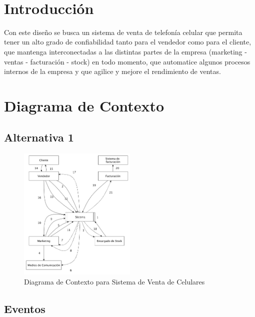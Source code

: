 ‌\section{Introducción}
Con este diseño se busca un sistema de venta de telefonía celular que permita tener un alto grado de confiabilidad tanto para el vendedor como para el cliente, que mantenga interconectadas a las distintas partes de la empresa (marketing - ventas - facturación - stock) en todo momento, que automatice algunos procesos internos de la empresa y que agilice y mejore el rendimiento de ventas.\\

\section{Diagrama de Contexto}

\subsection{Alternativa 1}

\begin{figure}[h!]
  \centering
  \includegraphics[width=0.5\textwidth]{./imagenes/contexto_1.pdf}
  \caption{Diagrama de Contexto para Sistema de Venta de Celulares}
\end{figure}

\subsection{Eventos}

